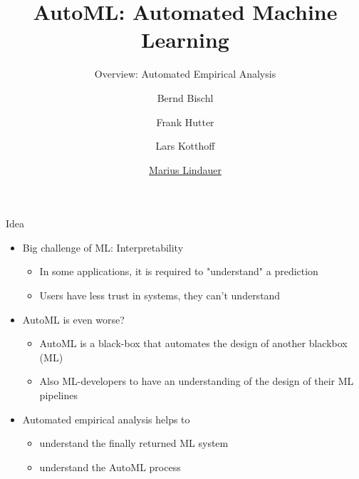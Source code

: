 




\title[AutoML: Overview]{AutoML: Automated Machine Learning}
\subtitle{Overview: Automated Empirical Analysis}
\author[Marius Lindauer]{Bernd Bischl \and Frank Hutter \and Lars Kotthoff \and \underline{Marius Lindauer}}
\institute{}
\date{}





	
	\maketitle
	

\begin{frame}[c]{Idea}


\begin{itemize}
	\item Big challenge of ML: Interpretability
	\begin{itemize}
		\item In some applications, it is required to "understand" a prediction 
		\item Users have less trust in systems, they can't understand
	\end{itemize}

	\bigskip
	\pause
	\item AutoML is even worse?
	\begin{itemize}
		\item AutoML  is a black-box that automates the design  of another blackbox (ML)
		\item Also ML-developers to have an understanding of the design of their ML pipelines
	\end{itemize}

	\bigskip
	\item Automated empirical analysis helps to
	\begin{itemize}
		\item understand the finally returned ML system
		\item understand the AutoML process
	\end{itemize}

\end{itemize}

\end{frame}

